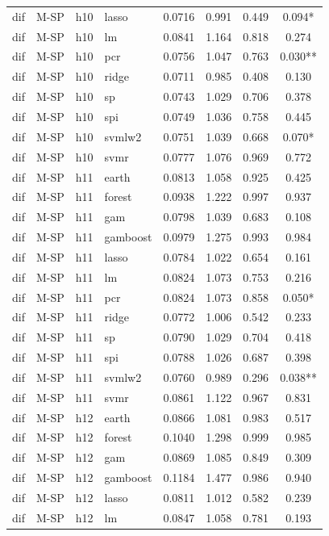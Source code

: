 \begin{ThreePartTable}
\begin{longtable}[t]{llclcccc}
dif & M-SP & h10 & lasso & 0.0716 & 0.991 & 0.449 & 0.094*\\
dif & M-SP & h10 & lm & 0.0841 & 1.164 & 0.818 & 0.274\\
dif & M-SP & h10 & pcr & 0.0756 & 1.047 & 0.763 & 0.030**\\
dif & M-SP & h10 & ridge & 0.0711 & 0.985 & 0.408 & 0.130\\
dif & M-SP & h10 & sp & 0.0743 & 1.029 & 0.706 & 0.378\\
dif & M-SP & h10 & spi & 0.0749 & 1.036 & 0.758 & 0.445\\
dif & M-SP & h10 & svmlw2 & 0.0751 & 1.039 & 0.668 & 0.070*\\
dif & M-SP & h10 & svmr & 0.0777 & 1.076 & 0.969 & 0.772\\
\addlinespace
dif & M-SP & h11 & earth & 0.0813 & 1.058 & 0.925 & 0.425\\
dif & M-SP & h11 & forest & 0.0938 & 1.222 & 0.997 & 0.937\\
dif & M-SP & h11 & gam & 0.0798 & 1.039 & 0.683 & 0.108\\
dif & M-SP & h11 & gamboost & 0.0979 & 1.275 & 0.993 & 0.984\\
dif & M-SP & h11 & lasso & 0.0784 & 1.022 & 0.654 & 0.161\\
dif & M-SP & h11 & lm & 0.0824 & 1.073 & 0.753 & 0.216\\
dif & M-SP & h11 & pcr & 0.0824 & 1.073 & 0.858 & 0.050*\\
dif & M-SP & h11 & ridge & 0.0772 & 1.006 & 0.542 & 0.233\\
dif & M-SP & h11 & sp & 0.0790 & 1.029 & 0.704 & 0.418\\
dif & M-SP & h11 & spi & 0.0788 & 1.026 & 0.687 & 0.398\\
dif & M-SP & h11 & svmlw2 & 0.0760 & 0.989 & 0.296 & 0.038**\\
dif & M-SP & h11 & svmr & 0.0861 & 1.122 & 0.967 & 0.831\\
\addlinespace
dif & M-SP & h12 & earth & 0.0866 & 1.081 & 0.983 & 0.517\\
dif & M-SP & h12 & forest & 0.1040 & 1.298 & 0.999 & 0.985\\
dif & M-SP & h12 & gam & 0.0869 & 1.085 & 0.849 & 0.309\\
dif & M-SP & h12 & gamboost & 0.1184 & 1.477 & 0.986 & 0.940\\
dif & M-SP & h12 & lasso & 0.0811 & 1.012 & 0.582 & 0.239\\
dif & M-SP & h12 & lm & 0.0847 & 1.058 & 0.781 & 0.193\\

\end{longtable}
\end{ThreePartTable}
